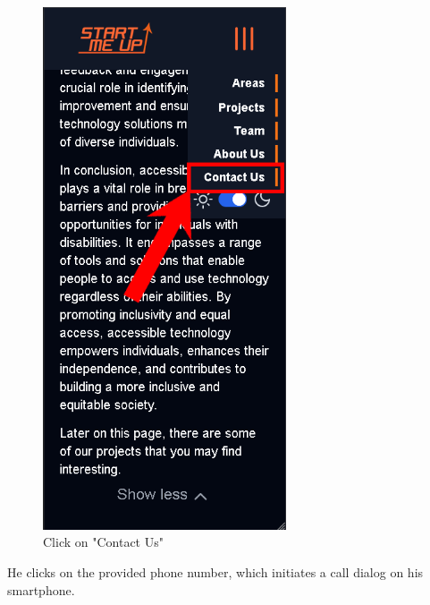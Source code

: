 \documentclass[11pt, letterpaper]{article}
\begin{document}
\begin{figure}[H]
\begin{minipage}[b]{0.4\textwidth}
    \includegraphics[width=7.2cm]{images/Scenarios/Scenario4/Screen10.png}
    \caption{Click on "Contact Us"}
    \label{fig:scenario4_10}
  \end{minipage}
\end{figure}
\noindent
He clicks on the provided phone number, which initiates a call dialog on his smartphone.
\end{document}
